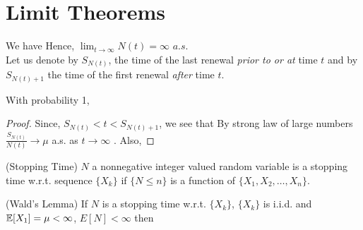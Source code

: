 \documentclass[all-lectures.tex]{subfiles}
\author{}
\begin{document}
\setcounter{chapter}{2}
\setcounter{section}{1}
\section*{}
\chr
\section{Limit Theorems}
We have 
Hence, $\lim_{t\to\infty} N(t) = \infty$ $a.s$. \\
\indent Let us denote by $S_{N(t)}$, the time of the last renewal \textit{prior to or at} time $t$ and by $S_{N(t)+1}$ the time of the first renewal \textit{after} time $t$.
\begin{prop}
With probability 1,
\end{prop}
\begin{proof}
Since, $S_{N(t)} < t < S_{N(t)+1}$, we see that
By strong law of large numbers $\frac{S_{N(t)}}{N(t)} \to \mu$ a.s. as $t \to \infty$ . Also,
 \qedhere
\end{proof}

\begin{defn}
(Stopping Time)
$N$ a nonnegative integer valued random variable is a stopping time w.r.t. sequence $\{X_k\}$ if $\{ N\le n\}$ is a function of $\{X_{1}, X_{2}, \dots, X_n\}$.
\end{defn}
\begin{thm}
(Wald's Lemma)
If $N$ is a stopping time w.r.t. $\{X_k\}$, $\{X_k\}$ is i.i.d. and $\mathbb{E}[X_1] = \mu < \infty$, $E[N] < \infty$ then
\end{thm}
\end{document}
